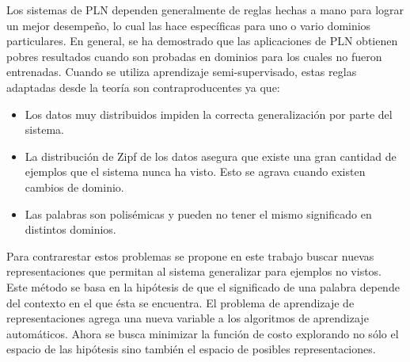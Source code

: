 \documentclass[11pt,spanish]{article}
\begin{document}
Los sistemas de PLN dependen generalmente de reglas hechas a mano para lograr un mejor desempeño, lo cual las hace específicas para uno o vario dominios particulares. En general, se ha demostrado que las aplicaciones de PLN obtienen pobres resultados cuando son probadas en dominios para los cuales no fueron entrenadas.
Cuando se utiliza aprendizaje semi-supervisado, estas reglas adaptadas desde la teoría son contraproducentes ya que:
\begin{itemize}
    \item Los datos muy distribuidos impiden la correcta generalización por parte del sistema.
    \item La distribución de Zipf de los datos asegura que existe una gran cantidad de ejemplos que el sistema nunca ha visto. Esto se agrava cuando existen cambios de dominio.
    \item Las palabras son polisémicas y pueden no tener el mismo significado en distintos dominios.
\end{itemize}
Para contrarestar estos problemas se propone en este trabajo buscar nuevas representaciones que permitan al sistema generalizar para ejemplos no vistos. Este método se basa en la hipótesis de que el significado de una palabra depende del contexto en el que ésta se encuentra.
El problema de aprendizaje de representaciones agrega una nueva variable a los algoritmos de aprendizaje automáticos. Ahora se busca minimizar la función de costo explorando no sólo el espacio de las hipótesis sino también el espacio de posibles representaciones.
\end{document}
